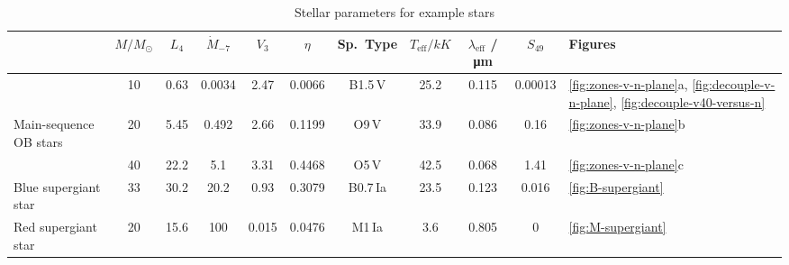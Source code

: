 \message{ !name(dusty-bow-wave.tex)}\documentclass[useAMS, usenatbib, a4paper]{mnras}
\begin{document}
\begin{table}
  \centering
  \caption{Stellar parameters for example stars}
  \label{tab:stars}
  \begin{tabular}{l S S S S S S S S S l}
    \toprule
    & {\(M / \si{M_\odot}\)} & {\(L_4\)}
    & {\(\dot{M}_{-7}\)} & {\(V_3\)} & {\( \eta \)}
    & {Sp.~Type} 
    & {\(T_{\text{eff}} / \si{kK}\)} & {\(\lambda_{\text{eff}}\) / \si{\um}}
    & {\(S_{49}\)} & Figures 
    \\
    \midrule
    & 10 & 0.63 & 0.0034 & 2.47 & 0.0066 & {B1.5\,V} & 25.2 & 0.115 & 0.00013
                   & \ref{fig:zones-v-n-plane}a,
                     \ref{fig:decouple-v-n-plane},
                     \ref{fig:decouple-v40-versus-n} \\
    Main-sequence OB stars
    & 20 & 5.45 & 0.492 & 2.66 & 0.1199 & {O9\,V} & 33.9 & 0.086 & 0.16
                   & \ref{fig:zones-v-n-plane}b\\
    & 40 & 22.2 & 5.1 & 3.31 & 0.4468 & {O5\,V} & 42.5 & 0.068 & 1.41
                   & \ref{fig:zones-v-n-plane}c\\[\smallskipamount]
    Blue supergiant star
    & 33 & 30.2 & 20.2 & 0.93 & 0.3079 & {B0.7\,Ia} & 23.5 & 0.123 & 0.016
                   & \ref{fig:B-supergiant} \\[\smallskipamount]
    Red supergiant star
    & 20 & 15.6 & 100 & 0.015 & 0.0476 & {M1\,Ia} & 3.6 & 0.805 & 0
                   & \ref{fig:M-supergiant} \\ 
    \bottomrule
  \end{tabular}
\end{table}
\end{document}
